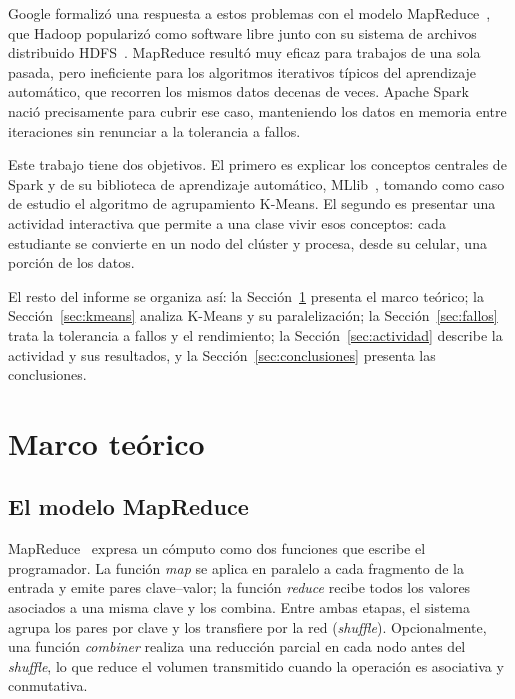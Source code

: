 \documentclass[conference,a4paper]{IEEEtran}
\begin{document}
Google formalizó una respuesta a estos problemas con el modelo MapReduce~\cite{dean2004mapreduce}, que Hadoop popularizó como software libre junto con su sistema de archivos distribuido HDFS~\cite{shvachko2010hdfs}. MapReduce resultó muy eficaz para trabajos de una sola pasada, pero ineficiente para los algoritmos iterativos típicos del aprendizaje automático, que recorren los mismos datos decenas de veces. Apache Spark~\cite{zaharia2010spark,zaharia2012rdd} nació precisamente para cubrir ese caso, manteniendo los datos en memoria entre iteraciones sin renunciar a la tolerancia a fallos.

Este trabajo tiene dos objetivos. El primero es explicar los conceptos centrales de Spark y de su biblioteca de aprendizaje automático, MLlib~\cite{meng2016mllib}, tomando como caso de estudio el algoritmo de agrupamiento K-Means. El segundo es presentar una actividad interactiva que permite a una clase vivir esos conceptos: cada estudiante se convierte en un nodo del clúster y procesa, desde su celular, una porción de los datos.

El resto del informe se organiza así: la Sección~\ref{sec:marco} presenta el marco teórico; la Sección~\ref{sec:kmeans} analiza K-Means y su paralelización; la Sección~\ref{sec:fallos} trata la tolerancia a fallos y el rendimiento; la Sección~\ref{sec:actividad} describe la actividad y sus resultados, y la Sección~\ref{sec:conclusiones} presenta las conclusiones.

\section{Marco teórico}
\label{sec:marco}

\subsection{El modelo MapReduce}

MapReduce~\cite{dean2004mapreduce} expresa un cómputo como dos funciones que escribe el programador. La función \textit{map} se aplica en paralelo a cada fragmento de la entrada y emite pares clave--valor; la función \textit{reduce} recibe todos los valores asociados a una misma clave y los combina. Entre ambas etapas, el sistema agrupa los pares por clave y los transfiere por la red (\textit{shuffle}). Opcionalmente, una función \textit{combiner} realiza una reducción parcial en cada nodo antes del \textit{shuffle}, lo que reduce el volumen transmitido cuando la operación es asociativa y conmutativa.
\end{document}
